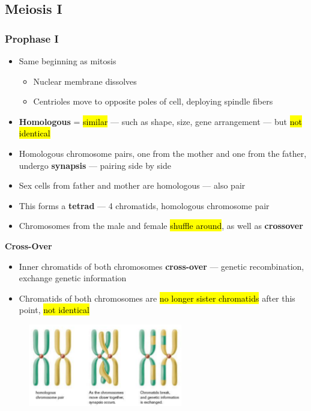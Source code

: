 \documentclass[a4paper,12pt]{article}
\begin{document}
\subsection{Meiosis I}

\subsubsection{Prophase I}
\begin{itemize}
    \item{Same beginning as mitosis
          \begin{itemize}
              \item{Nuclear membrane dissolves}
              \item{Centrioles move to opposite poles of cell, deploying spindle fibers}
          \end{itemize}
         }
     \item{\textbf{Homologous} = \hl{similar} --- such as shape, size, gene arrangement --- but \hl{not identical}}
     \item{Homologous chromosome pairs, one from the mother and one from the father, undergo \textbf{synapsis} --- pairing side by side}
     \item{Sex cells from father and mother are homologous --- also pair}
     \item{This forms a \textbf{tetrad} --- 4 chromatids, homologous chromosome pair}
     \item{Chromosomes from the male and female \hl{shuffle around}, as well as \textbf{crossover}}
\end{itemize}
\textbf{Cross-Over}
\begin{itemize}
     \item{Inner chromatids of both chromosomes \textbf{cross-over} --- genetic recombination, exchange genetic information}
     \item{Chromatids of both chromosomes are \hl{no longer sister chromatids} after this point, \hl{not identical}}
\end{itemize}

\begin{figure}[H]
    \centering
    \includegraphics[width=0.6\textwidth]{synapsis}
\end{figure}
\end{document}
